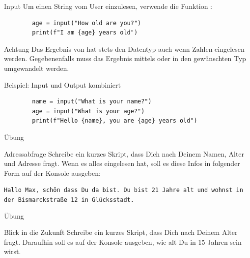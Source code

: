 \begin{fragile}
	\begin{block}{Input}
		\vspace{2pt}
		Um einen String vom User einzulesen, verwende die Funktion :
		
		\begin{verbatim}
		age = input("How old are you?")
		print(f"I am {age} years old")
		\end{verbatim}
	\end{block}
	\pause 
	\begin{alertblock}{Achtung}
		\vspace{2pt}
		Das Ergebnis von  hat stets den Datentyp  auch wenn Zahlen eingelesen werden. Gegebenenfalls muss das Ergebnis mittels  oder  in den gewünschten Typ umgewandelt werden. 	
	\end{alertblock}
	
\end{fragile}


\begin{fragile}[]
	\begin{exampleblock}{Beispiel: Input und Output kombiniert}
		\begin{verbatim}
		name = input("What is your name?")
		age = input("What is your age?")
		print(f"Hello {name}, you are {age} years old") 
		\end{verbatim}
	\end{exampleblock}
\end{fragile}

\begin{frame}{Übung}
\begin{block}{Adressabfrage}
\vspace{2pt}
Schreibe ein kurzes Skript, dass Dich nach Deinem Namen, Alter und Adresse fragt. Wenn es alles eingelesen hat, soll es diese Infos in folgender Form auf der Konsole ausgeben: 	

\texttt{Hallo Max, schön dass Du da bist. Du bist 21 Jahre alt und wohnst in der Bismarckstraße 12 in Glücksstadt.}
\end{block}
\end{frame}


\begin{frame}{Übung}
\begin{block}{Blick in die Zukunft}
	\vspace{2pt}
Schreibe ein kurzes Skript, dass Dich nach Deinem Alter fragt. Daraufhin soll es auf der Konsole ausgeben, wie alt Du in 15 Jahren sein wirst. 
\end{block}
\end{frame}

